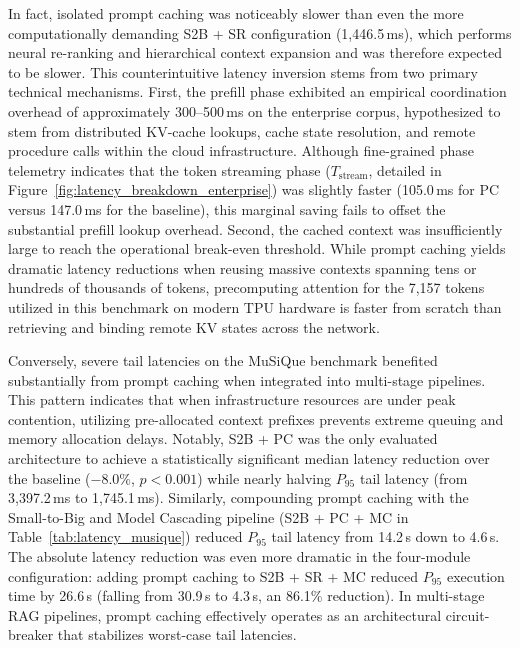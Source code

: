 In fact, isolated prompt caching was noticeably slower than even the more computationally demanding S2B + SR configuration (1,446.5\,ms), which performs neural re-ranking and hierarchical context expansion and was therefore expected to be slower. This counterintuitive latency inversion stems from two primary technical mechanisms. First, the prefill phase exhibited an empirical coordination overhead of approximately 300--500\,ms on the enterprise corpus, hypothesized to stem from distributed KV-cache lookups, cache state resolution, and remote procedure calls within the cloud infrastructure. Although fine-grained phase telemetry indicates that the token streaming phase ($T_{\text{stream}}$, detailed in Figure~\ref{fig:latency_breakdown_enterprise}) was slightly faster (105.0\,ms for PC versus 147.0\,ms for the baseline), this marginal saving fails to offset the substantial prefill lookup overhead. Second, the cached context was insufficiently large to reach the operational break-even threshold. While prompt caching yields dramatic latency reductions when reusing massive contexts spanning tens or hundreds of thousands of tokens, precomputing attention for the 7,157 tokens utilized in this benchmark on modern TPU hardware is faster from scratch than retrieving and binding remote KV states across the network.

Conversely, severe tail latencies on the MuSiQue benchmark benefited substantially from prompt caching when integrated into multi-stage pipelines. This pattern indicates that when infrastructure resources are under peak contention, utilizing pre-allocated context prefixes prevents extreme queuing and memory allocation delays. Notably, S2B + PC was the only evaluated architecture to achieve a statistically significant median latency reduction over the baseline ($-8.0\%$, $p < 0.001$) while nearly halving $P_{95}$ tail latency (from 3,397.2\,ms to 1,745.1\,ms). Similarly, compounding prompt caching with the Small-to-Big and Model Cascading pipeline (S2B + PC + MC in Table~\ref{tab:latency_musique}) reduced $P_{95}$ tail latency from 14.2\,s down to 4.6\,s. The absolute latency reduction was even more dramatic in the four-module configuration: adding prompt caching to S2B + SR + MC reduced $P_{95}$ execution time by 26.6\,s (falling from 30.9\,s to 4.3\,s, an 86.1\% reduction). In multi-stage RAG pipelines, prompt caching effectively operates as an architectural circuit-breaker that stabilizes worst-case tail latencies.

